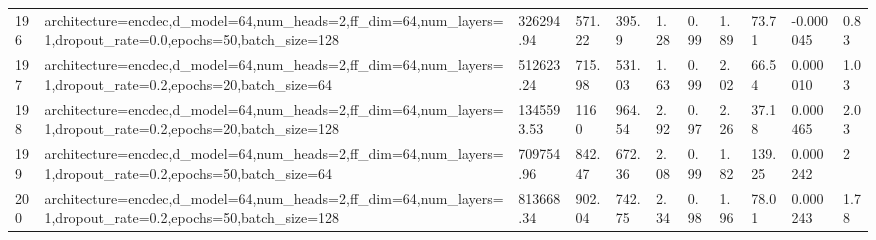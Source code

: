 \begin{longtable}{C{0.8cm} L{2cm} C{1.15cm} C{1.15cm} C{1.15cm} C{1.15cm} C{0.85cm} C{1.25cm} C{1.2cm} C{1.5cm} C{1.0cm}}
196 & architecture=encdec,\newline d\_model=64,\newline num\_heads=2,\newline ff\_dim=64,\newline num\_layers=1,\newline dropout\_rate=0.0,\newline epochs=50,\newline batch\_size=128 & 326294.94 & 571.22 & 395.9 & 1.28 & 0.99 & 1.89 & 73.71 & -0.000045 & 0.83 \\
197 & architecture=encdec,\newline d\_model=64,\newline num\_heads=2,\newline ff\_dim=64,\newline num\_layers=1,\newline dropout\_rate=0.2,\newline epochs=20,\newline batch\_size=64 & 512623.24 & 715.98 & 531.03 & 1.63 & 0.99 & 2.02 & 66.54 & 0.000010 & 1.03 \\
198 & architecture=encdec,\newline d\_model=64,\newline num\_heads=2,\newline ff\_dim=64,\newline num\_layers=1,\newline dropout\_rate=0.2,\newline epochs=20,\newline batch\_size=128 & 1345593.53 & 1160 & 964.54 & 2.92 & 0.97 & 2.26 & 37.18 & 0.000465 & 2.03 \\
199 & architecture=encdec,\newline d\_model=64,\newline num\_heads=2,\newline ff\_dim=64,\newline num\_layers=1,\newline dropout\_rate=0.2,\newline epochs=50,\newline batch\_size=64 & 709754.96 & 842.47 & 672.36 & 2.08 & 0.99 & 1.82 & 139.25 & 0.000242 & 2 \\
200 & architecture=encdec,\newline d\_model=64,\newline num\_heads=2,\newline ff\_dim=64,\newline num\_layers=1,\newline dropout\_rate=0.2,\newline epochs=50,\newline batch\_size=128 & 813668.34 & 902.04 & 742.75 & 2.34 & 0.98 & 1.96 & 78.01 & 0.000243 & 1.78 \\

\end{longtable}
